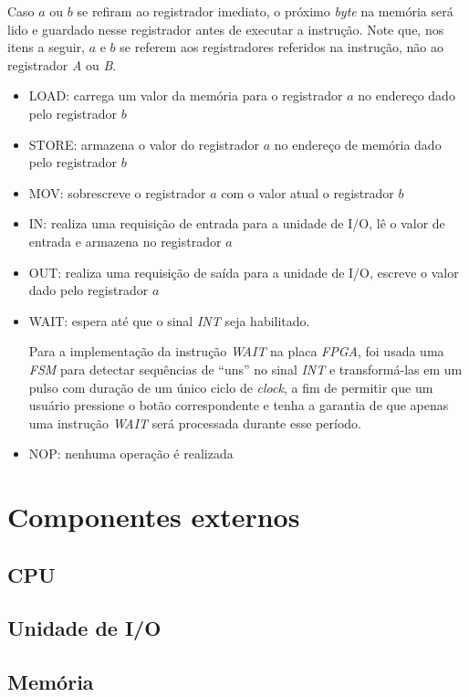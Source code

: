 \documentclass[a4paper,12pt]{report}
\begin{document}
Caso $a$ ou $b$ se refiram ao registrador imediato, o próximo \textit{byte} na 
memória será lido e guardado nesse registrador antes de executar a instrução. Note que,
nos itens a seguir, $a$ e $b$ se referem aos registradores referidos na instrução, 
não ao registrador \textit{A} ou \textit{B}.

\begin{itemize}
	\item LOAD: carrega um valor da memória para o registrador $a$ no endereço dado pelo registrador $b$
	\item STORE: armazena o valor do registrador $a$ no endereço de memória dado pelo registrador $b$
	\item MOV: sobrescreve o registrador $a$ com o valor atual o registrador $b$
	\item IN: realiza uma requisição de entrada para a unidade de I/O, lê o valor de entrada e armazena no registrador $a$
	\item OUT: realiza uma requisição de saída para a unidade de I/O, escreve o valor dado pelo registrador $a$
	\item WAIT: espera até que o sinal \textit{INT} seja habilitado.

	Para a implementação da instrução \textit{WAIT} na placa \textit{FPGA}, foi usada uma \textit{FSM} para detectar
	sequências de ``uns'' no sinal \textit{INT} e transformá-las em um pulso com duração de um único ciclo
	de \textit{clock}, a fim de permitir que um usuário pressione o botão correspondente e tenha a garantia de que 
	apenas uma instrução \textit{WAIT} será processada durante esse período.

	\item NOP: nenhuma operação é realizada
\end{itemize}

\section*{Componentes externos}

\subsection*{CPU}

\subsection*{Unidade de I/O}

\subsection*{Memória}
\end{document}
